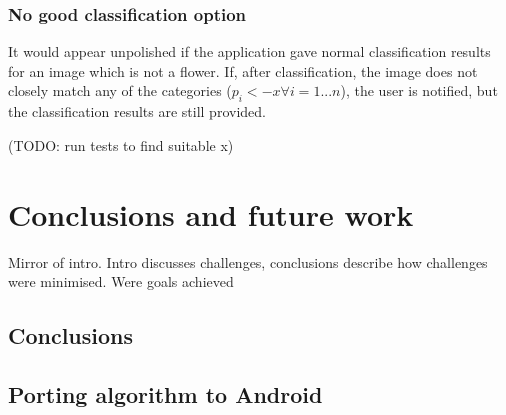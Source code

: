 \documentclass[11pt, a4paper]{report}
\begin{document}



\subsection{No good classification option}

It would appear unpolished if the application gave normal classification results for an image which is not a flower. If, after classification, the image does not closely match any of the categories ($p_{i} < -x \forall i = 1 ... n$), the user is notified, but the classification results are still provided.  

(TODO: run tests to find suitable x)


\chapter{Conclusions and future work}
Mirror of intro. Intro discusses challenges, conclusions describe how challenges were minimised. Were goals achieved

\section{Conclusions}

\section{Porting algorithm to Android}

\printbibliography
\end{document}

